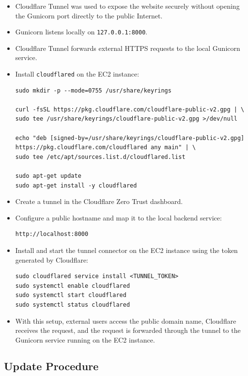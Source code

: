 \documentclass[12pt,a4paper]{article}
\begin{document}
\begin{itemize}
    \item Cloudflare Tunnel was used to expose the website securely without opening the Gunicorn port directly to the public Internet.
    \item Gunicorn listens locally on \texttt{127.0.0.1:8000}.
    \item Cloudflare Tunnel forwards external HTTPS requests to the local Gunicorn service.

    \item Install \texttt{cloudflared} on the EC2 instance:
\begin{lstlisting}
sudo mkdir -p --mode=0755 /usr/share/keyrings

curl -fsSL https://pkg.cloudflare.com/cloudflare-public-v2.gpg | \
sudo tee /usr/share/keyrings/cloudflare-public-v2.gpg >/dev/null

echo "deb [signed-by=/usr/share/keyrings/cloudflare-public-v2.gpg] https://pkg.cloudflare.com/cloudflared any main" | \
sudo tee /etc/apt/sources.list.d/cloudflared.list

sudo apt-get update
sudo apt-get install -y cloudflared
\end{lstlisting}

    \item Create a tunnel in the Cloudflare Zero Trust dashboard.
    \item Configure a public hostname and map it to the local backend service:
\begin{lstlisting}
http://localhost:8000
\end{lstlisting}

    \item Install and start the tunnel connector on the EC2 instance using the token generated by Cloudflare:
\begin{lstlisting}
sudo cloudflared service install <TUNNEL_TOKEN>
sudo systemctl enable cloudflared
sudo systemctl start cloudflared
sudo systemctl status cloudflared
\end{lstlisting}

    \item With this setup, external users access the public domain name, Cloudflare receives the request, and the request is forwarded through the tunnel to the Gunicorn service running on the EC2 instance.
\end{itemize}

\subsection{Update Procedure}
\end{document}
